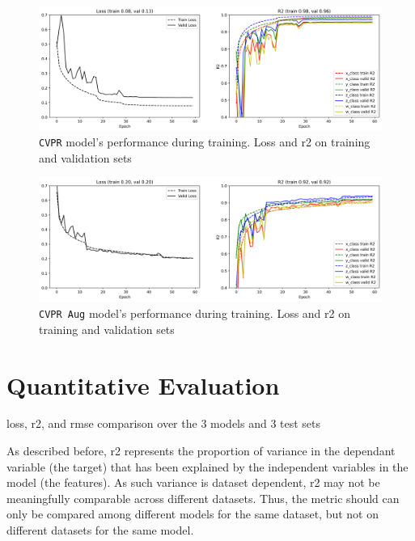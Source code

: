\begin{figure}[H]
	\centering
	\includegraphics[width=1 \textwidth]{"contents/images/06-training-CVPR"}
	\caption[\texttt{CVPR} model's performance during training. Loss and \gls{r2} on training and validation sets]{\texttt{CVPR} model's performance during training. Loss and \gls{r2} on training and validation sets}
	\label{fig:training-metrics-cvpr}
\end{figure}

\begin{figure}[H]
	\centering
	\includegraphics[width=1 \textwidth]{"contents/images/06-training-CVPRaug"}
	\caption[\texttt{CVPR Aug} model's performance during training. Loss and \gls{r2} on training and validation sets]{\texttt{CVPR Aug} model's performance during training. Loss and \gls{r2} on training and validation sets}
	\label{fig:training-metrics-cvpraug}
\end{figure}




\section{Quantitative Evaluation}
\label{sec:evaluation-quantitative}

\lipsum[1-2]

loss, r2, and rmse comparison over the 3 models and 3 test sets

As described before, \gls{r2} represents the proportion of variance in the dependant variable (the target) that has been explained by the independent variables in the model (the features). As such variance is dataset dependent, \gls{r2} may not be meaningfully comparable across different datasets. Thus, the metric should can only be compared among different models for the same dataset, but not on different datasets for the same model.

